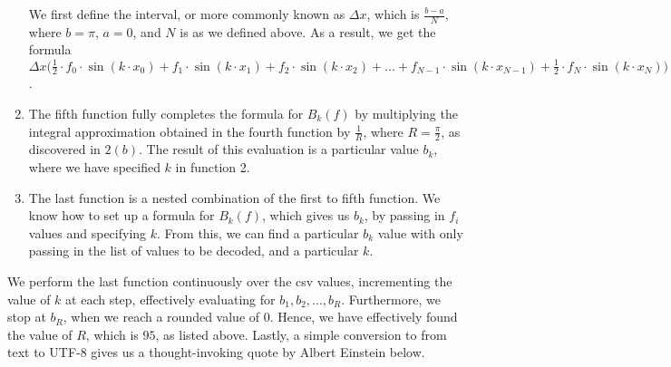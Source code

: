 \begin{enumerate}
        We first define the interval, or more commonly known as $\Delta x$, which is $\frac{b-a}{N}$, where $b = \pi$, $a = 0$, and $N$ is as we defined above.
        \newline As a result, we get the formula $\Delta x \bigg(\frac{1}{2} \cdot f_0 \cdot \sin(k \cdot x_0) + f_1 \cdot \sin(k \cdot x_1) + f_2 \cdot \sin(k \cdot x_2) + ... + f_{N-1} \cdot \sin(k \cdot x_{N-1}) + \frac{1}{2} \cdot f_N \cdot \sin(k \cdot x_N)\bigg)$.
  \item The fifth function fully completes the formula for $B_k(f)$ by multiplying the integral approximation obtained in the fourth function by $\frac{1}{R}$, where $R = \frac{\pi}{2}$, as discovered in $2(b)$.
        \vspace{0.1cm}
        \newline
        The result of this evaluation is a particular value $b_k$, where we have specified $k$ in function 2.
  \item The last function is a nested combination of the first to fifth function.
        We know how to set up a formula for $B_k(f)$, which gives us $b_k$,
        by passing in $f_i$ values and specifying $k$.
        From this, we can find a particular $b_k$ value with only passing in the list of values to be decoded, and a particular $k$.
\end{enumerate}

We perform the last function continuously over the csv values, incrementing the value of $k$ at each step,
effectively evaluating for $b_1, b_2, ... , b_R$.
Furthermore, we stop at $b_R$, when we reach a rounded value of $0$.
Hence, we have effectively found the value of $R$, which is $95$, as listed above.
Lastly, a simple conversion to from text to UTF-8 gives us a thought-invoking quote by Albert Einstein below.


